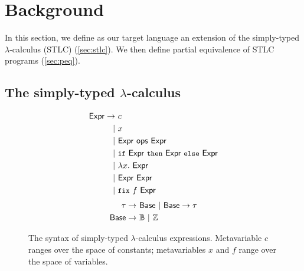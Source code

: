 \section{Background}
\label{sec:background}
%
In this section, we define as our target language an extension of the
simply-typed $\lambda$-calculus (STLC) (\autoref{sec:stlc}).
%
We then define partial equivalence of STLC programs
(\autoref{sec:peq}).

\subsection{The simply-typed $\lambda$-calculus}
\label{sec:stlc}
\begin{figure}[t]
  \caption{The syntax of simply-typed $\lambda$-calculus expressions.
    Metavariable $c$ ranges over the space of constants; %
    metavariables $x$ and $f$ range over the space of variables.}
  \label{fig:syntax}
  \begin{floatrow}[2]
    {  \begin{align*}
        \expr \rightarrow &\ c \\
        | &\ x \\
        | &\ \expr\ \ops\ \expr \\
        | &\ \cc{if}\ \expr\ \cc{then}\ \expr\ \cc{else}\ \expr \\
        | &\ \lambda x.\ \expr \\
        | &\ \expr\ \expr \\
        | &\ \cc{fix}\ f\ \expr
      \end{align*} }
    { \begin{align*} %
        \tau \rightarrow &\ \base\ %
        |\ \base \to \tau \\
        \base \rightarrow &\ \bools\ %
        |\ \ints
      \end{align*} }
  \end{floatrow}

\end{figure}

